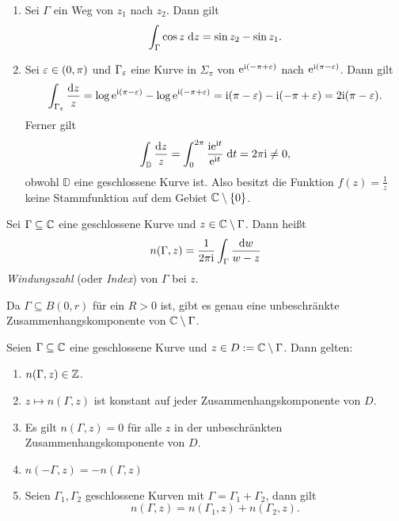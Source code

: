 \documentclass[a4paper,twoside,DIV15,BCOR12mm]{scrbook}
\begin{document}
\begin{bsp}\label{bsp2.14}
  \begin{enumerate}
  \item Sei $\Gamma$ ein Weg von $z_1$ nach $z_2$. Dann gilt
    \[\int_{\Gamma}^{}{\cos{z}}\;\mathrm{d} z = \sin{z_2}-\sin{z_1}.\]
  \item Sei $\varepsilon\in(0,\pi)$ und $\Gamma_\varepsilon$ eine Kurve in $\Sigma_\pi$ von $\mathrm{e}^{\mathrm{i}(-\pi+\varepsilon)}$ nach $\mathrm{e}^{\mathrm{i}(\pi-\varepsilon)}$. Dann
    gilt
    \[\int_{\Gamma_\varepsilon}{\frac{\mathrm{d} z}{z}} = \log{\mathrm{e}^{\mathrm{i}(\pi-\varepsilon)}} - \log{\mathrm{e}^{\mathrm{i}(-\pi+\varepsilon)}} = \mathrm{i}(\pi-\varepsilon) - \mathrm{i}(-\pi+\varepsilon)
    = 2\mathrm{i}(\pi-\varepsilon).\]
    Ferner gilt
    \[\int_{\mathbb{D}}{\frac{\mathrm{d} z}{z}} = \int_{0}^{2\pi}{\frac{\mathrm{i}\mathrm{e}^{\mathrm{i} t}}{\mathrm{e}^{\mathrm{i} t}}}\;\mathrm{d} t = 2\pi\mathrm{i} \neq 0,\]
    obwohl $\mathbb{D}$ eine geschlossene Kurve ist. Also besitzt die Funktion $f(z)=\frac1z$ keine Stammfunktion auf dem Gebiet
    $\mathbb{C}\setminus\{0\}$.
  \end{enumerate}
\end{bsp}

\begin{dfn}\label{dfn2.15}
  Sei $\Gamma\subseteq\mathbb{C}$ eine geschlossene Kurve und $z\in\mathbb{C}\setminus\Gamma$. Dann heißt
  \[ n(\Gamma,z) = \frac{1}{2\pi\mathrm{i}} \int_\Gamma{\frac{\mathrm{d}w}{w-z}} \]
  \emph{Windungszahl} (oder \emph{Index}) von $\Gamma$ bei $z$.
\end{dfn}


\begin{bem*} Da $\Gamma \subseteq B(0,r)$ für ein $R>0$ ist, gibt es genau eine unbeschränkte Zusammenhangskomponente von $\mathbb{C}\setminus\Gamma$.
\end{bem*}

\begin{satz}\label{satz2.16}
Seien $\Gamma \subseteq \mathbb{C}$ eine geschlossene Kurve und $z\in D:= \mathbb{C}\setminus\Gamma$. Dann gelten:
\begin{enumerate}
\item $n(\Gamma,z)\in\mathbb{Z}$.
\item $z\mapsto n(\Gamma,z)$ ist konstant auf jeder Zusammenhangskomponente von $D$.
\item \label{satz2.16:c} Es gilt $n(\Gamma,z) = 0$ für alle $z$ in der unbeschränkten Zusammenhangskomponente von $D$.
\item $n(-\Gamma,z) = -n(\Gamma,z)$
\item Seien $\Gamma_1,\Gamma_2$ geschlossene Kurven mit $\Gamma = \Gamma_1 + \Gamma_2$, dann gilt
\[n(\Gamma,z) = n(\Gamma_1,z)+n(\Gamma_2,z).\]
\end{enumerate}
\end{satz}
\end{document}
